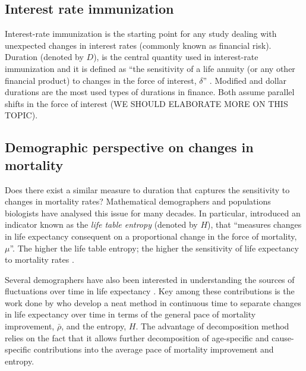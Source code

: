 \documentclass[12pt]{article}
\begin{document}
\subsection{Interest rate immunization}

Interest-rate immunization \citep{redington1951papers,fisher1971coping,shiu1990redington,santomero1997financial,courtois2007immunization} is the starting point for any study dealing with unexpected changes in interest rates (commonly known as financial risk). Duration (denoted by $D$), is the central quantity used in interest-rate immunization and it is defined as “the sensitivity of a life annuity (or any other financial product) to changes in the force of interest, $\delta$” \citep{milevsky2013life,charupat2016sluggish}. Modified and dollar durations are the most used types of durations in finance. Both assume parallel shifts in the force of interest (WE SHOULD ELABORATE MORE ON THIS TOPIC).




\subsection*{Demographic perspective on changes in mortality}

Does there exist a similar measure to duration that captures the sensitivity to changes in mortality rates?
Mathematical demographers and populations biologists \citep{leser1955variations,keyfitz1968introduction,keyfitz1977difference,demetrius1974demographic,mitra1978short,goldman1986new,Vaupel1986,hakkert1987life,fernandez2015entropy} have analysed this issue for many decades. In particular, \citet{leser1955variations,demetrius1974demographic,keyfitz1977difference} introduced an indicator known as the \textit{life table entropy} (denoted by $H$), that  “measures changes in life expectancy consequent on a proportional change in the force of mortality, $\mu$”. The higher the life table entropy; the higher the sensitivity of life expectancy to mortality rates \citep{vaupel2011life,aburto2019threshold,aburto2020dynamics}.


Several demographers have also been interested in understanding the sources of fluctuations over time in life expectancy \citep{arriaga1984measuring,pollard1988decomposition,beltran2008integrated,beltran2011unifying}. Key among these contributions is the work done by \citet{Vaupel2003} who develop a neat method in continuous time to separate changes in life expectancy over time in terms of the general pace of mortality improvement, $\bar{\rho}$, and the entropy, $H$. The advantage of \citet{Vaupel2003} decomposition method relies on the fact that it allows further decomposition of age-specific and cause-specific contributions into the average pace of mortality improvement and entropy.
\end{document}
